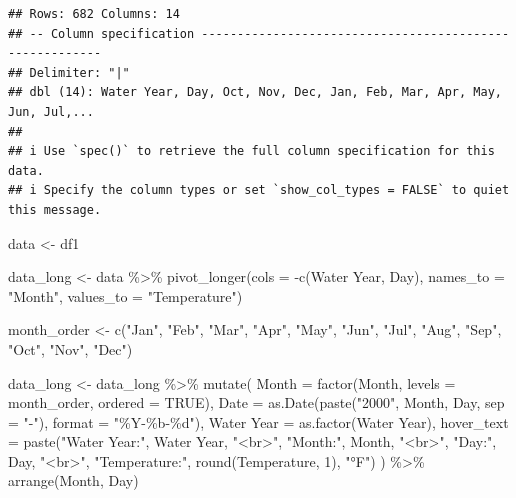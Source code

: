 \documentclass[
]{book}
\newenvironment{Shaded}{\begin{snugshade}}{\end{snugshade}}
\newcommand{\AttributeTok}[1]{\textcolor[rgb]{0.77,0.63,0.00}{#1}}
\newcommand{\ConstantTok}[1]{\textcolor[rgb]{0.00,0.00,0.00}{#1}}
\newcommand{\DecValTok}[1]{\textcolor[rgb]{0.00,0.00,0.81}{#1}}
\newcommand{\FunctionTok}[1]{\textcolor[rgb]{0.00,0.00,0.00}{#1}}
\newcommand{\NormalTok}[1]{#1}
\newcommand{\OtherTok}[1]{\textcolor[rgb]{0.56,0.35,0.01}{#1}}
\newcommand{\SpecialCharTok}[1]{\textcolor[rgb]{0.00,0.00,0.00}{#1}}
\newcommand{\StringTok}[1]{\textcolor[rgb]{0.31,0.60,0.02}{#1}}
\theoremstyle{definition}
\theoremstyle{definition}
\theoremstyle{definition}
\theoremstyle{definition}
\theoremstyle{remark}
\begin{document}
\begin{verbatim}
## Rows: 682 Columns: 14
## -- Column specification --------------------------------------------------------
## Delimiter: "|"
## dbl (14): Water Year, Day, Oct, Nov, Dec, Jan, Feb, Mar, Apr, May, Jun, Jul,...
## 
## i Use `spec()` to retrieve the full column specification for this data.
## i Specify the column types or set `show_col_types = FALSE` to quiet this message.
\end{verbatim}

\begin{Shaded}
\begin{Highlighting}[]
\NormalTok{data }\OtherTok{\textless{}{-}}\NormalTok{ df1}

\NormalTok{data\_long }\OtherTok{\textless{}{-}}\NormalTok{ data }\SpecialCharTok{\%\textgreater{}\%}
  \FunctionTok{pivot\_longer}\NormalTok{(}\AttributeTok{cols =} \SpecialCharTok{{-}}\FunctionTok{c}\NormalTok{(}\StringTok{\textasciigrave{}}\AttributeTok{Water Year}\StringTok{\textasciigrave{}}\NormalTok{, Day),}
               \AttributeTok{names\_to =} \StringTok{"Month"}\NormalTok{,}
               \AttributeTok{values\_to =} \StringTok{"Temperature"}\NormalTok{)}

\NormalTok{month\_order }\OtherTok{\textless{}{-}} \FunctionTok{c}\NormalTok{(}\StringTok{"Jan"}\NormalTok{, }\StringTok{"Feb"}\NormalTok{, }\StringTok{"Mar"}\NormalTok{, }\StringTok{"Apr"}\NormalTok{, }\StringTok{"May"}\NormalTok{, }\StringTok{"Jun"}\NormalTok{, }\StringTok{"Jul"}\NormalTok{, }\StringTok{"Aug"}\NormalTok{, }\StringTok{"Sep"}\NormalTok{, }\StringTok{"Oct"}\NormalTok{, }\StringTok{"Nov"}\NormalTok{, }\StringTok{"Dec"}\NormalTok{)}

\NormalTok{data\_long }\OtherTok{\textless{}{-}}\NormalTok{ data\_long }\SpecialCharTok{\%\textgreater{}\%}
  \FunctionTok{mutate}\NormalTok{(}
    \AttributeTok{Month =} \FunctionTok{factor}\NormalTok{(Month, }\AttributeTok{levels =}\NormalTok{ month\_order, }\AttributeTok{ordered =} \ConstantTok{TRUE}\NormalTok{),}
    \AttributeTok{Date =} \FunctionTok{as.Date}\NormalTok{(}\FunctionTok{paste}\NormalTok{(}\StringTok{"2000"}\NormalTok{, Month, Day, }\AttributeTok{sep =} \StringTok{"{-}"}\NormalTok{), }\AttributeTok{format =} \StringTok{"\%Y{-}\%b{-}\%d"}\NormalTok{),}
    \StringTok{\textasciigrave{}}\AttributeTok{Water Year}\StringTok{\textasciigrave{}} \OtherTok{=} \FunctionTok{as.factor}\NormalTok{(}\StringTok{\textasciigrave{}}\AttributeTok{Water Year}\StringTok{\textasciigrave{}}\NormalTok{),}
    \AttributeTok{hover\_text =} \FunctionTok{paste}\NormalTok{(}\StringTok{"Water Year:"}\NormalTok{, }\StringTok{\textasciigrave{}}\AttributeTok{Water Year}\StringTok{\textasciigrave{}}\NormalTok{, }\StringTok{"\textless{}br\textgreater{}"}\NormalTok{,}
                       \StringTok{"Month:"}\NormalTok{, Month, }\StringTok{"\textless{}br\textgreater{}"}\NormalTok{,}
                       \StringTok{"Day:"}\NormalTok{, Day, }\StringTok{"\textless{}br\textgreater{}"}\NormalTok{,}
                       \StringTok{"Temperature:"}\NormalTok{, }\FunctionTok{round}\NormalTok{(Temperature, }\DecValTok{1}\NormalTok{), }\StringTok{"°F"}\NormalTok{)}
\NormalTok{  ) }\SpecialCharTok{\%\textgreater{}\%}
  \FunctionTok{arrange}\NormalTok{(Month, Day)}


\end{Highlighting}
\end{Shaded}
\end{document}
